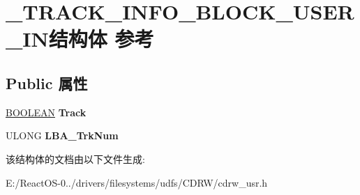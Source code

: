 \hypertarget{struct___t_r_a_c_k___i_n_f_o___b_l_o_c_k___u_s_e_r___i_n}{}\section{\+\_\+\+T\+R\+A\+C\+K\+\_\+\+I\+N\+F\+O\+\_\+\+B\+L\+O\+C\+K\+\_\+\+U\+S\+E\+R\+\_\+\+I\+N结构体 参考}
\label{struct___t_r_a_c_k___i_n_f_o___b_l_o_c_k___u_s_e_r___i_n}
\subsection*{Public 属性}
\begin{DoxyCompactItemize}
\item 
\mbox{\label{struct___t_r_a_c_k___i_n_f_o___b_l_o_c_k___u_s_e_r___i_n_a5389217bb2e2c04872cbca577c7d071a}} 
\hyperlink{_processor_bind_8h_a112e3146cb38b6ee95e64d85842e380a}{B\+O\+O\+L\+E\+AN} {\bfseries Track}
\item 
\mbox{\label{struct___t_r_a_c_k___i_n_f_o___b_l_o_c_k___u_s_e_r___i_n_a9feab19248fd2f051c47adc625493840}} 
U\+L\+O\+NG {\bfseries L\+B\+A\+\_\+\+Trk\+Num}
\end{DoxyCompactItemize}


该结构体的文档由以下文件生成\+:\begin{DoxyCompactItemize}
\item 
E\+:/\+React\+O\+S-\/0../drivers/filesystems/udfs/\+C\+D\+R\+W/cdrw\+\_\+usr.\+h\end{DoxyCompactItemize}
